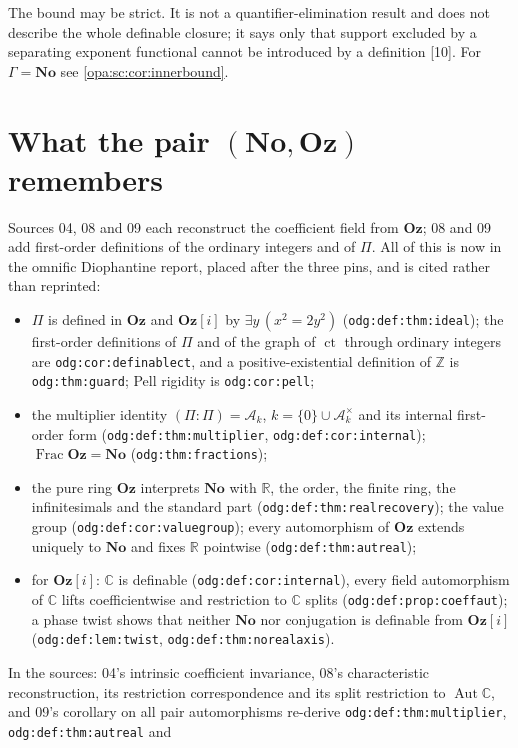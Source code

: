 \documentclass[11pt,oneside]{article}
\numberwithin{equation}{section}
\theoremstyle{definition}
\theoremstyle{remark}
\newcommand{\No}{\mathbf{No}}
\newcommand{\Oz}{\mathbf{Oz}}
\newcommand{\Og}{\mathbf{Oz}[i]}
\newcommand{\R}{\mathbb R}
\newcommand{\C}{\mathbb C}
\newcommand{\Z}{\mathbb Z}
\newcommand{\Ak}{\mathcal A_k}
\newcommand{\Aut}{\operatorname{Aut}}
\newcommand{\ct}{\operatorname{ct}}
\newcommand{\Frac}{\operatorname{Frac}}
\newcommand{\src}[1]{\textup{\textsf{\small[#1]}}}
\newcommand{\lbl}[1]{\nolinkurl{#1}}
\begin{document}
The bound may be strict. It is not a quantifier-elimination result and does
not describe the whole definable closure; it says only that support excluded
by a separating exponent functional cannot be introduced by a definition
\src{10}. For $\Gamma=\No$ see \cref{opa:sc:cor:innerbound}.

\section{What the pair \texorpdfstring{$(\No,\Oz)$}{(No, Oz)} remembers}\label{opa:sec:remember}

Sources 04, 08 and 09 each reconstruct the coefficient field from $\Oz$; 08 and
09 add first-order definitions of the ordinary integers and of $\Pi$. All of
this is now in the omnific Diophantine report, placed after the three pins,
and is cited rather than reprinted:
\begin{itemize}[itemsep=1pt]
\item $\Pi$ is defined in $\Oz$ and $\Og$ by $\exists y\,(x^2=2y^2)$
(\lbl{odg:def:thm:ideal}); the first-order definitions of $\Pi$ and of the graph
of $\ct$ through ordinary integers are \lbl{odg:cor:definablect}, and a
positive-existential definition of $\Z$ is \lbl{odg:thm:guard}; Pell rigidity is
\lbl{odg:cor:pell};
\item the multiplier identity $(\Pi:\Pi)=\Ak$, $k=\{0\}\cup\Ak^\times$ and its
internal first-order form (\lbl{odg:def:thm:multiplier},
\lbl{odg:def:cor:internal}); $\Frac\Oz=\No$ (\lbl{odg:thm:fractions});
\item the pure ring $\Oz$ interprets $\No$ with $\R$, the order, the finite ring,
the infinitesimals and the standard part (\lbl{odg:def:thm:realrecovery}); the
value group (\lbl{odg:def:cor:valuegroup}); every automorphism of $\Oz$ extends
uniquely to $\No$ and fixes $\R$ pointwise (\lbl{odg:def:thm:autreal});
\item for $\Og$: $\C$ is definable (\lbl{odg:def:cor:internal}), every field
automorphism of $\C$ lifts coefficientwise and restriction to $\C$ splits
(\lbl{odg:def:prop:coeffaut}); a phase twist shows that neither $\No$ nor
conjugation is definable from $\Og$ (\lbl{odg:def:lem:twist},
\lbl{odg:def:thm:norealaxis}).
\end{itemize}
In the sources: 04's intrinsic coefficient invariance, 08's characteristic
reconstruction, its restriction correspondence and its split restriction to
$\Aut\C$, and 09's corollary on all pair automorphisms re-derive
\lbl{odg:def:thm:multiplier}, \lbl{odg:def:thm:autreal} and
\end{document}
